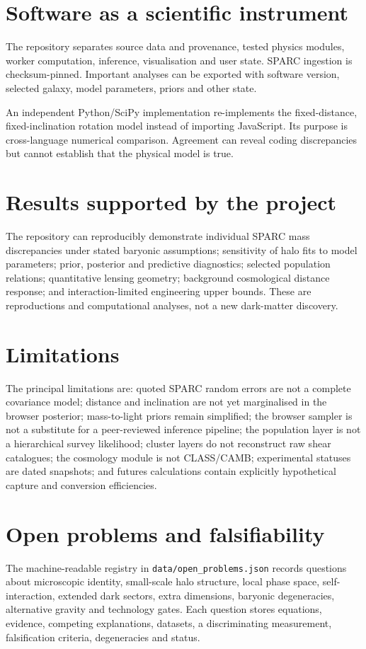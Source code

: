 \documentclass[11pt,a4paper]{article}
\begin{document}
\section{Software as a scientific instrument}
The repository separates source data and provenance, tested physics modules, worker computation, inference, visualisation and user state. SPARC ingestion is checksum-pinned. Important analyses can be exported with software version, selected galaxy, model parameters, priors and other state.

An independent Python/SciPy implementation re-implements the fixed-distance, fixed-inclination rotation model instead of importing JavaScript. Its purpose is cross-language numerical comparison. Agreement can reveal coding discrepancies but cannot establish that the physical model is true.

\section{Results supported by the project}
The repository can reproducibly demonstrate individual SPARC mass discrepancies under stated baryonic assumptions; sensitivity of halo fits to model parameters; prior, posterior and predictive diagnostics; selected population relations; quantitative lensing geometry; background cosmological distance response; and interaction-limited engineering upper bounds. These are reproductions and computational analyses, not a new dark-matter discovery.

\section{Limitations}
The principal limitations are: quoted SPARC random errors are not a complete covariance model; distance and inclination are not yet marginalised in the browser posterior; mass-to-light priors remain simplified; the browser sampler is not a substitute for a peer-reviewed inference pipeline; the population layer is not a hierarchical survey likelihood; cluster layers do not reconstruct raw shear catalogues; the cosmology module is not CLASS/CAMB; experimental statuses are dated snapshots; and futures calculations contain explicitly hypothetical capture and conversion efficiencies.

\section{Open problems and falsifiability}
The machine-readable registry in \texttt{data/open\_problems.json} records questions about microscopic identity, small-scale halo structure, local phase space, self-interaction, extended dark sectors, extra dimensions, baryonic degeneracies, alternative gravity and technology gates. Each question stores equations, evidence, competing explanations, datasets, a discriminating measurement, falsification criteria, degeneracies and status.
\end{document}
